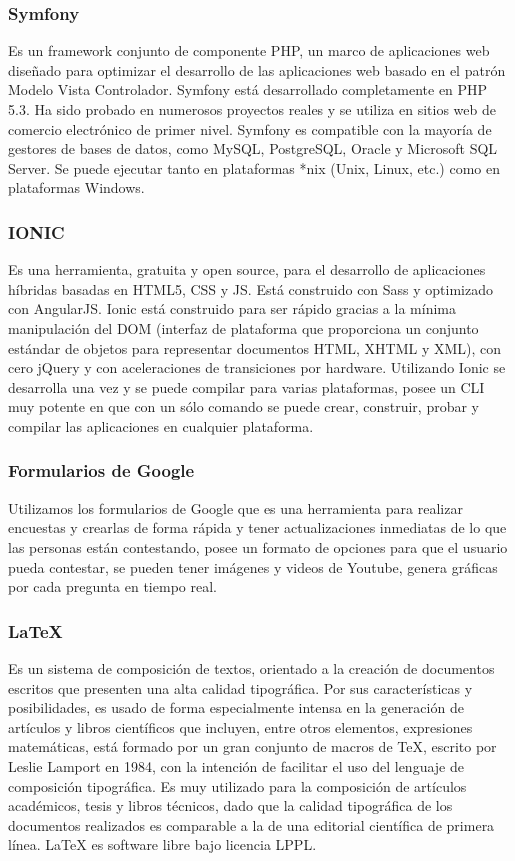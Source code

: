 \documentclass[a4paper,openright,11pt]{article}
\begin{document}
\subsubsection{Symfony}
Es un framework conjunto de componente PHP, un marco de aplicaciones web  diseñado para optimizar el desarrollo de las aplicaciones web basado en el patrón Modelo Vista Controlador. Symfony está desarrollado completamente en PHP 5.3. Ha sido probado en numerosos proyectos reales y se utiliza en sitios web de comercio electrónico de primer nivel. Symfony es compatible con la mayoría de gestores de bases de datos, como MySQL, PostgreSQL, Oracle y Microsoft SQL Server. Se puede ejecutar tanto en plataformas *nix (Unix, Linux, etc.) como en plataformas Windows.

\subsubsection{IONIC}
Es una herramienta, gratuita y open source, para el desarrollo de aplicaciones híbridas basadas en HTML5, CSS y JS. Está construido con Sass y optimizado con AngularJS. Ionic está construido para ser rápido gracias a la mínima manipulación del DOM (interfaz de plataforma que proporciona un conjunto estándar de objetos para representar documentos HTML, XHTML y XML), con cero jQuery y con aceleraciones de transiciones por hardware. Utilizando Ionic se desarrolla una vez y se puede compilar para varias plataformas, posee un CLI muy potente en que con un sólo comando se puede crear, construir, probar y compilar las aplicaciones en cualquier plataforma.

\subsubsection{Formularios de Google}
Utilizamos los formularios de Google que es una herramienta para realizar encuestas y crearlas de forma rápida y tener actualizaciones inmediatas de lo que las personas están contestando, posee un formato de opciones para que el usuario pueda contestar, se pueden tener imágenes y videos de Youtube, genera gráficas por cada pregunta en tiempo real.

\subsubsection{\textbf{\LaTeX}}
Es un sistema de composición de textos, orientado a la creación de documentos escritos que presenten una alta calidad tipográfica. Por sus características y posibilidades, es usado de forma especialmente intensa en la generación de artículos y libros científicos que incluyen, entre otros elementos, expresiones matemáticas, está formado por un gran conjunto de macros de TeX, escrito por Leslie Lamport en 1984, con la intención de facilitar el uso del lenguaje de composición tipográfica. Es muy utilizado para la composición de artículos académicos, tesis y libros técnicos, dado que la calidad tipográfica de los documentos realizados es comparable a la de una editorial científica de primera línea. \LaTeX \hspace{0.1cm} es software libre bajo licencia LPPL.
\end{document}

